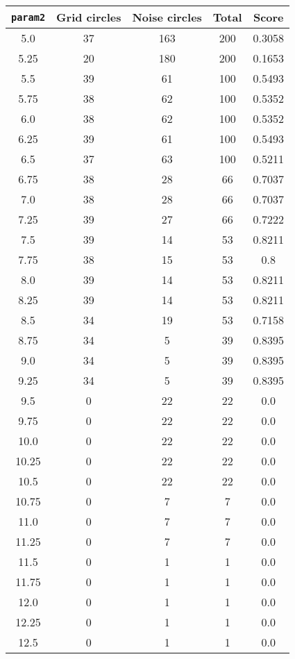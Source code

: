 \documentclass[letterpaper, 12pt]{article}
\begin{document}
\begin{longtable}{|c|c|c|c|c|}
\hline
\textbf{\texttt{param2}} & \textbf{Grid circles} & \textbf{Noise circles} & \textbf{Total} & \textbf{Score} \\
\hline
5.0 & 37 & 163 & 200 & 0.3058 \\
\hline
5.25 & 20 & 180 & 200 & 0.1653 \\
\hline
5.5 & 39 & 61 & 100 & 0.5493 \\
\hline
5.75 & 38 & 62 & 100 & 0.5352 \\
\hline
6.0 & 38 & 62 & 100 & 0.5352 \\
\hline
6.25 & 39 & 61 & 100 & 0.5493 \\
\hline
6.5 & 37 & 63 & 100 & 0.5211 \\
\hline
6.75 & 38 & 28 & 66 & 0.7037 \\
\hline
7.0 & 38 & 28 & 66 & 0.7037 \\
\hline
7.25 & 39 & 27 & 66 & 0.7222 \\
\hline
7.5 & 39 & 14 & 53 & 0.8211 \\
\hline
7.75 & 38 & 15 & 53 & 0.8 \\
\hline
8.0 & 39 & 14 & 53 & 0.8211 \\
\hline
8.25 & 39 & 14 & 53 & 0.8211 \\
\hline
8.5 & 34 & 19 & 53 & 0.7158 \\
\hline
8.75 & 34 & 5 & 39 & 0.8395 \\
\hline
9.0 & 34 & 5 & 39 & 0.8395 \\
\hline
9.25 & 34 & 5 & 39 & 0.8395 \\
\hline
9.5 & 0 & 22 & 22 & 0.0 \\
\hline
9.75 & 0 & 22 & 22 & 0.0 \\
\hline
10.0 & 0 & 22 & 22 & 0.0 \\
\hline
10.25 & 0 & 22 & 22 & 0.0 \\
\hline
10.5 & 0 & 22 & 22 & 0.0 \\
\hline
10.75 & 0 & 7 & 7 & 0.0 \\
\hline
11.0 & 0 & 7 & 7 & 0.0 \\
\hline
11.25 & 0 & 7 & 7 & 0.0 \\
\hline
11.5 & 0 & 1 & 1 & 0.0 \\
\hline
11.75 & 0 & 1 & 1 & 0.0 \\
\hline
12.0 & 0 & 1 & 1 & 0.0 \\
\hline
12.25 & 0 & 1 & 1 & 0.0 \\
\hline
12.5 & 0 & 1 & 1 & 0.0 \\

\end{longtable}
\end{document}
